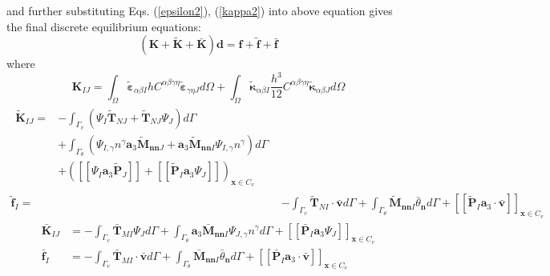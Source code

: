 and further substituting Eqs. (\ref{epsilon2}), (\ref{kappa2}) into above equation gives the final discrete equilibrium equations: 
\begin{equation}
        (\boldsymbol K + \tilde{\boldsymbol K} + \bar{\boldsymbol K} )\boldsymbol d = \boldsymbol f + \tilde{\boldsymbol f} + \bar{\boldsymbol f}
\end{equation}
where
\begin{equation}\label{de1}
        \boldsymbol K_{IJ} = \int_\Omega \tilde{\boldsymbol \varepsilon}_{\alpha\beta I} hC^{\alpha\beta\gamma\eta}\tilde{\boldsymbol \varepsilon}_{\gamma\eta J} d\Omega + \int_\Omega \tilde{\boldsymbol \kappa}_{\alpha\beta I} \frac{h^3}{12}C^{\alpha\beta\gamma\eta} \tilde{\boldsymbol \kappa}_{\alpha\beta J} d\Omega
\end{equation}
\begin{subequations}\label{de2}
\begin{align}
\begin{split}
        \tilde{\boldsymbol K}_{IJ} = &- \int_{\Gamma_v} (\Psi_I \tilde{\boldsymbol T}_{NJ} + \tilde{\boldsymbol T}_{NJ} \Psi_J) d\Gamma \\
                                     &+ \int_{\Gamma_\theta} (\Psi_{I,\gamma} n^\gamma \boldsymbol a_3 \tilde{\boldsymbol M}_{\boldsymbol{nn}J} + \boldsymbol a_3 \tilde{\boldsymbol M}_{\boldsymbol{nn}I} \Psi_{I,\gamma}n^\gamma)d\Gamma \\
                                     & + ([[\Psi_I \boldsymbol a_3 \tilde{\boldsymbol P}_J]] + [[\tilde{\boldsymbol P}_I \boldsymbol a_3 \Psi_J]])_{\boldsymbol x \in C_v}
\end{split} \\
\tilde{\boldsymbol f}_I = &- \int_{\Gamma_v} \tilde{\boldsymbol T}_{NI} \cdot \bar{\boldsymbol v} d\Gamma + \int_{\Gamma_\theta} \tilde{\boldsymbol M}_{\boldsymbol{nn}I} \bar{\theta}_{\boldsymbol n} d\Gamma + [[\tilde{\boldsymbol P}_I\boldsymbol a_3 \cdot \bar{\boldsymbol v}]]_{\boldsymbol x \in C_v}
\end{align}
\end{subequations}
\begin{subequations}\label{de3}
\begin{align}
\bar{\boldsymbol K}_{IJ} &= - \int_{\Gamma_v} \bar{\boldsymbol T}_{MI} \Psi_J d\Gamma 
+ \int_{\Gamma_\theta} \boldsymbol a_3\bar{\boldsymbol M}_{\boldsymbol{nn}I} \Psi_{J,\gamma}n^\gamma d\Gamma + [[\bar{\boldsymbol P}_I \boldsymbol a_3 \Psi_J]]_{\boldsymbol x \in C_v} \\
\bar{\boldsymbol f}_I &= - \int_{\Gamma_v} \bar{\boldsymbol T}_{MI} \cdot \bar{\boldsymbol v} d\Gamma + \int_{\Gamma_\theta} \bar{\boldsymbol M}_{\boldsymbol{nn} I} \bar{\theta}_{\boldsymbol n} d\Gamma + [[\bar{\boldsymbol P}_I\boldsymbol a_3 \cdot \bar{\boldsymbol v}]]_{\boldsymbol x \in C_v}
\end{align}
\end{subequations}

